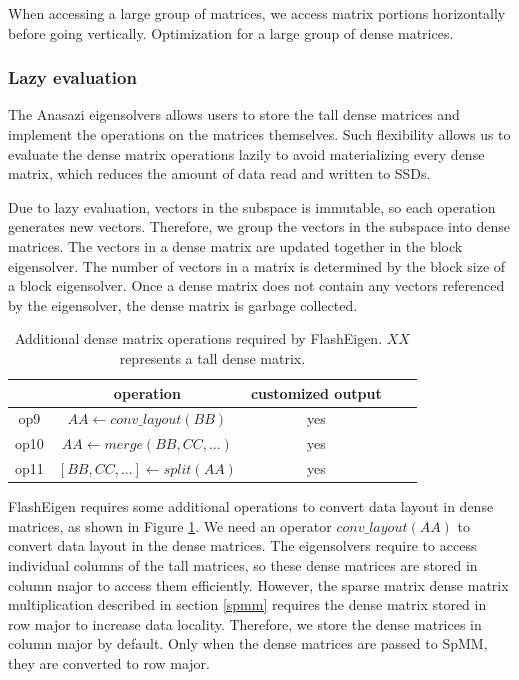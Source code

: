 
When accessing a large group of matrices, we access matrix portions horizontally
before going vertically.
Optimization for a large group of dense matrices.

\subsubsection{Lazy evaluation} \label{sec:lazy_eval}
The Anasazi eigensolvers allows users to store the tall dense matrices and
implement the operations on the matrices themselves. Such flexibility allows
us to evaluate the dense matrix operations lazily \cite{Ching12} to avoid
materializing
every dense matrix, which reduces the amount of data read and written to SSDs.

Due to lazy evaluation, vectors in the subspace is immutable, so each operation
generates new vectors. Therefore, we group the vectors in the subspace into
dense matrices. The vectors in a dense matrix are updated together in the block
eigensolver. The number of vectors in a matrix is determined by the block
size of a block eigensolver. Once a dense matrix does not contain any vectors
referenced by the eigensolver, the dense matrix is garbage collected.

\begin{table}
	\begin{center}
		\small
		\begin{tabular}{|c|c|c|c|c|}
			\hline
			& operation & customized output \\
			\hline
			op9 & $AA \leftarrow conv\_layout(BB)$ & yes \\
			\hline
			op10 & $AA \leftarrow merge(BB, CC, ...)$ & yes \\
			\hline
			op11 & $[BB, CC, ...] \leftarrow split(AA)$ & yes \\
			\hline
		\end{tabular}
		\normalsize
	\end{center}
	\caption{Additional dense matrix operations required by FlashEigen.
		$XX$ represents a tall dense matrix.}
	\label{add_ops}
\end{table}

FlashEigen requires some additional operations to convert data layout
in dense matrices, as shown in Figure \ref{add_ops}.
We need an operator $conv\_layout(AA)$ to convert data layout
in the dense matrices. The eigensolvers require to access individual columns
of the tall matrices, so these dense matrices are stored in column major
to access them efficiently. However,
the sparse matrix dense matrix multiplication described in section \ref{spmm}
requires the dense matrix stored in row major to increase data locality.
Therefore, we store the dense matrices in column major by default. Only
when the dense matrices are passed to SpMM, they are converted to row major.

